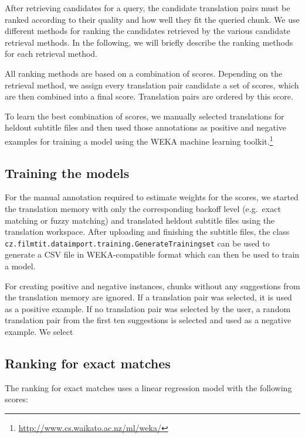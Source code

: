 After retrieving candidates for a query, the candidate translation pairs must be ranked according to their quality and how well they fit the queried chunk. We use different methods for ranking the candidates retrieved by the various candidate retrieval methods. In the following, we will briefly describe the ranking methods for each retrieval method.

All ranking methods are based on a combination of scores. Depending on the retrieval method, we assign every translation pair candidate a set of scores, which are then combined into a final score.  Translation pairs are ordered by this score.

To learn the best combination of scores, we manually selected translations for heldout subtitle files and then used those annotations as positive and negative examples for training a model using the WEKA machine learning toolkit.\footnote{\url{http://www.cs.waikato.ac.nz/ml/weka/}}

\subsection{Training the models}

For the manual annotation required to estimate weights for the scores, we started the translation memory with only the corresponding backoff level (e.g.\ exact matching or fuzzy matching) and translated heldout subtitle files using the translation workspace. After uploading and finishing the subtitle files, the class {\tt cz.filmtit.dataimport.training.GenerateTrainingset} can be used to generate a CSV file in WEKA-compatible format which can then be used to train a model.

For creating positive and negative instances, chunks without any suggestions from the translation memory are ignored. If a translation pair was selected, it is used as a positive example. If no translation pair was selected by the user, a random translation pair from the first ten suggestions is selected and used as a negative example. We select 


\subsection{Ranking for exact matches}

The ranking for exact matches uses a linear regression model with the following scores:

